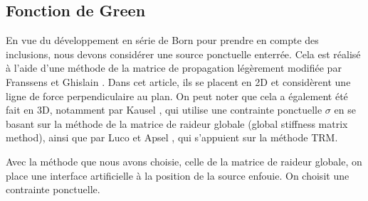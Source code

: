 
\subsection{Fonction de Green}

En vue du développement en série de Born pour prendre en compte des inclusions, nous devons considérer une source ponctuelle enterrée. Cela est réalisé à l'aide d'une méthode de la matrice de propagation légèrement modifiée par Franssens et Ghislain \cite{Franssens_Ghislain}. Dans cet article, ils se placent en 2D et considèrent une ligne de force perpendiculaire au plan. On peut noter que cela a également été fait en 3D, notamment par Kausel \cite{Kausel1981}, qui utilise une contrainte ponctuelle $\sigma$ en se basant sur la méthode de la matrice de raideur globale (global stiffness matrix method), ainsi que par Luco et Apsel \cite{Luco_Apsel}, qui s'appuient sur la méthode TRM.\par 

Avec la méthode que nous avons choisie, celle de la matrice de raideur globale, on place une interface artificielle à la position de la source enfouie. On choisit une contrainte ponctuelle. \par 


